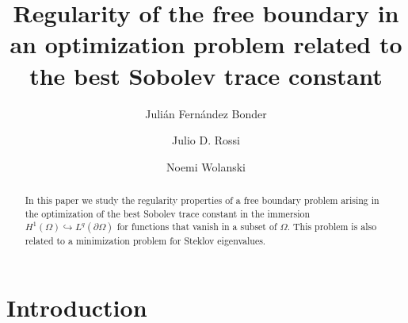 \documentclass[11pt]{amsart}
\title[Regularity in an optimization problem]{Regularity of the free boundary in an optimization problem related to the best Sobolev trace constant}
\author[J. Fernández Bonder]{Julián Fernández Bonder}
\author[J. D. Rossi]{Julio D. Rossi}
\author[N. Wolanski]{Noemi Wolanski}
\theoremstyle{definition}
\theoremstyle{remark}
\numberwithin{equation}{section}
\begin{document}
\begin{abstract}
In this paper we study the regularity properties of a free boundary problem arising in the optimization of the best Sobolev trace constant in the immersion $H^1(\Omega)\hookrightarrow L^q(\partial\Omega)$ for functions that vanish in a subset of $\Omega$. This problem is also related to a minimization problem for Steklov eigenvalues.
\end{abstract}

\maketitle

\section{Introduction}
\end{document}
